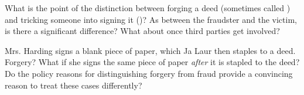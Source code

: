 
\item What is the point of the distinction between forging a deed (sometimes
called ) and tricking someone into signing it
()? As between the fraudster and the victim, is there a
significant difference? What about once third parties get involved?

\item Mrs. Harding signs a blank piece of paper, which Ja Laur then staples to a
deed. Forgery? What if she signs the same piece of paper \textit{after} it is
stapled to the deed? Do the policy reasons for distinguishing forgery from
fraud provide a convincing reason to treat these cases differently?

